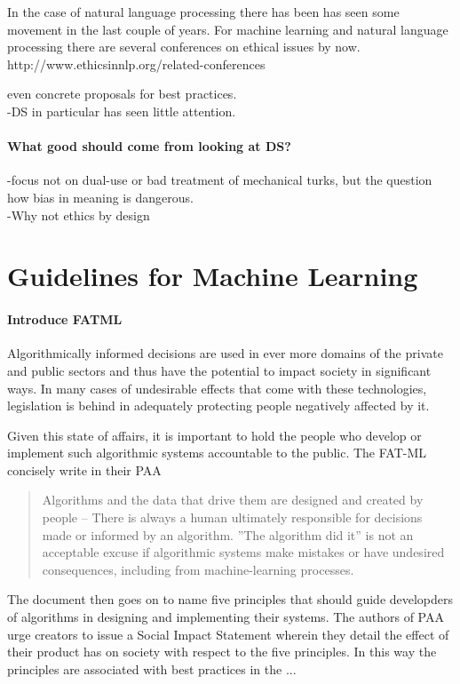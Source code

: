 \documentclass{article}
\begin{document}
In the case of natural language processing there has been  has seen some movement in the last couple of years.
For machine learning and natural language processing there are several  conferences on ethical issues by now.
http://www.ethicsinnlp.org/related-conferences


 even concrete proposals for best practices.\\
-DS in particular has seen little attention.

\paragraph{What good should come from looking at DS?}
-focus not on dual-use or bad treatment of mechanical turks, but the question how bias in meaning is dangerous.\\
-Why not ethics by design
\section{Guidelines for Machine Learning}\hypertarget{sec2}{}
\paragraph{Introduce FATML}
Algorithmically informed decisions are used in ever more domains of the private and public sectors and thus have the potential to impact society in significant ways. In many cases of undesirable effects that come with these technologies, legislation is behind in adequately protecting people negatively affected by it.

Given this state of affairs, it is important to hold the people who develop or implement such algorithmic systems accountable to the public. The FAT-ML concisely write in their PAA \cite{principles}
\begin{quote}
Algorithms and the data that drive them are designed and created by people -- There is always a human ultimately responsible for decisions made or informed by an algorithm. ''The algorithm did it'' is not an acceptable excuse if algorithmic systems make mistakes or have undesired consequences, including from machine-learning processes.
\end{quote}

The document then goes on to name five principles that should guide developders of algorithms in designing and implementing their systems. The authors of PAA urge creators to issue a Social Impact Statement wherein they detail the effect of their product has on society with respect to the five principles. In this way the principles are associated with best practices in the ...
\end{document}
